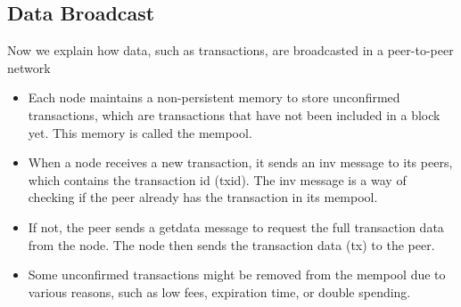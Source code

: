 \documentclass{report}
\begin{document}
\subsection{Data Broadcast}
Now we explain how data, such as transactions, are broadcasted in a peer-to-peer network
\begin{itemize}
	\item Each node maintains a non-persistent memory to store unconfirmed transactions, which are transactions that have not been included in a block yet. This memory is called the mempool.
	\item When a node receives a new transaction, it sends an inv message to its peers, which contains the transaction id (txid). The inv message is a way of checking if the peer already has the transaction in its mempool.
	\item If not, the peer sends a getdata message to request the full transaction data from the node. The node then sends the transaction data (tx) to the peer.
	\item Some unconfirmed transactions might be removed from the mempool due to various reasons, such as low fees, expiration time, or double spending.
\end{itemize}
\end{document}
